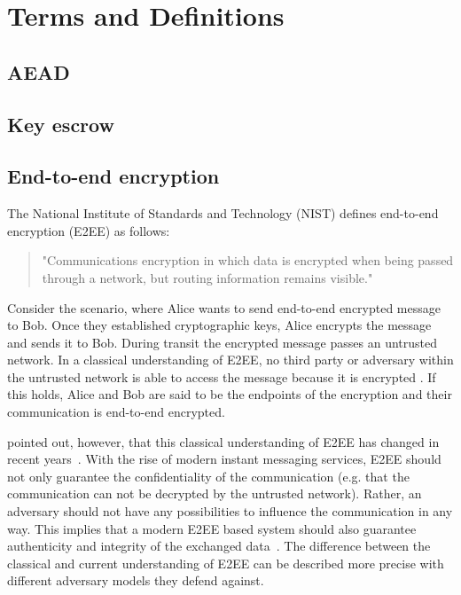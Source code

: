 \documentclass[../main.tex]{subfiles}
\begin{document}
\chapter{Terms and Definitions}
\section{AEAD}

\section{Key escrow}

\section{End-to-end encryption} \label{end-to-end}

The National Institute of Standards and Technology (NIST) defines end-to-end encryption (E2EE) as follows:
\begin{quote}
"Communications encryption in which data is encrypted when being passed through a network, but routing information remains visible."~\cite[88]{Nieles2017}
\end{quote}
Consider the scenario, where Alice wants to send end-to-end encrypted message to Bob.
Once they established cryptographic keys, Alice encrypts the message and sends it to Bob.
During transit the encrypted message passes an untrusted network.
In a classical understanding of E2EE, no third party or adversary within the untrusted network is able to access the message because it is encrypted \cite{Ermoshina2016}.
If this holds, Alice and Bob are said to be the endpoints of the encryption and their communication is end-to-end encrypted.

\citeauthor{Hale2022} pointed out, however, that this classical understanding of E2EE has changed in recent years~\cite{Hale2022}. 
With the rise of modern instant messaging services, E2EE should not only guarantee the confidentiality of the communication (e.g. that the communication can not be decrypted by the untrusted network).
Rather, an adversary should not have any possibilities to influence the communication in any way.
This implies that a modern E2EE based system should also guarantee authenticity and integrity of the exchanged data~\cite{Hale2022}. 
The difference between the classical and current understanding of E2EE can be described more precise with different adversary models they defend against.
\end{document}
